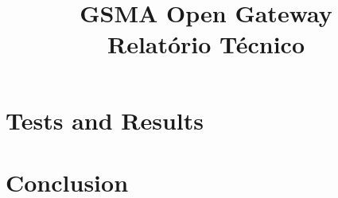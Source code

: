 \documentclass[code,math,bibliography]{relatorio-deti}
\title{GSMA Open Gateway\\[20pt]Relatório Técnico}
\begin{document}
\maketitle

%
%



\tableofcontents

\clearpage







\chapter{Tests and Results}

\chapter{Conclusion}

\printbibliography[heading=bibintoc]
\end{document}
